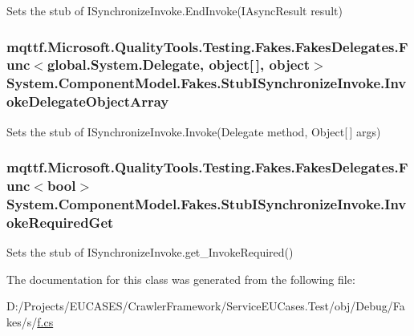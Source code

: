Sets the stub of I\-Synchronize\-Invoke.\-End\-Invoke(\-I\-Async\-Result result)

\hypertarget{class_system_1_1_component_model_1_1_fakes_1_1_stub_i_synchronize_invoke_afb0861c9fc9e31ba1af3f782405248e8}{
\subsubsection[{Invoke\-Delegate\-Object\-Array}]{\setlength{\rightskip}{0pt plus 5cm}mqttf.\-Microsoft.\-Quality\-Tools.\-Testing.\-Fakes.\-Fakes\-Delegates.\-Func$<$global.\-System.\-Delegate, object\mbox{[}$\,$\mbox{]}, object$>$ System.\-Component\-Model.\-Fakes.\-Stub\-I\-Synchronize\-Invoke.\-Invoke\-Delegate\-Object\-Array}}\label{class_system_1_1_component_model_1_1_fakes_1_1_stub_i_synchronize_invoke_afb0861c9fc9e31ba1af3f782405248e8}


Sets the stub of I\-Synchronize\-Invoke.\-Invoke(\-Delegate method, Object\mbox{[}$\,$\mbox{]} args)

\hypertarget{class_system_1_1_component_model_1_1_fakes_1_1_stub_i_synchronize_invoke_a315fd3346402af02a27bda3a41e71a44}{
\subsubsection[{Invoke\-Required\-Get}]{\setlength{\rightskip}{0pt plus 5cm}mqttf.\-Microsoft.\-Quality\-Tools.\-Testing.\-Fakes.\-Fakes\-Delegates.\-Func$<$bool$>$ System.\-Component\-Model.\-Fakes.\-Stub\-I\-Synchronize\-Invoke.\-Invoke\-Required\-Get}}\label{class_system_1_1_component_model_1_1_fakes_1_1_stub_i_synchronize_invoke_a315fd3346402af02a27bda3a41e71a44}


Sets the stub of I\-Synchronize\-Invoke.\-get\-\_\-\-Invoke\-Required()



The documentation for this class was generated from the following file\-:\begin{DoxyCompactItemize}
\item 
D\-:/\-Projects/\-E\-U\-C\-A\-S\-E\-S/\-Crawler\-Framework/\-Service\-E\-U\-Cases.\-Test/obj/\-Debug/\-Fakes/s/\hyperlink{s_2f_8cs}{f.\-cs}\end{DoxyCompactItemize}
